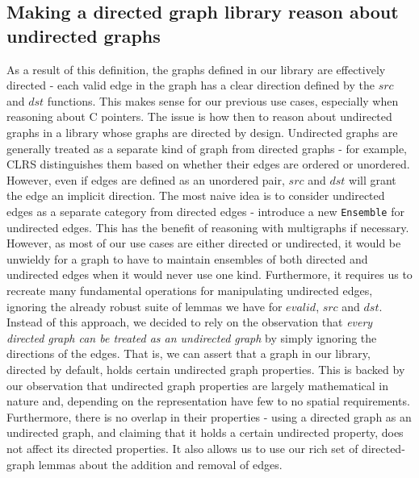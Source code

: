 \subsection{Making a directed graph library reason about undirected graphs}

As a result of this definition, the graphs defined in our library are effectively directed - each valid edge in the graph has a clear direction defined by the $src$ and $dst$ functions. This makes sense for our previous use cases, especially when reasoning about C pointers.
\newline\newline
The issue is how then to reason about undirected graphs in a library whose graphs are directed by design. Undirected graphs are generally treated as a separate kind of graph from directed graphs - for example, CLRS distinguishes them based on whether their edges are ordered or unordered. However, even if edges are defined as an unordered pair, $src$ and $dst$ will grant the edge an implicit direction.
\newline\newline
The most naive idea is to consider undirected edges as a separate category from directed edges - introduce a new \texttt{Ensemble} for undirected edges. This has the benefit of reasoning with multigraphs if necessary. However, as most of our use cases are either directed or undirected, it would be unwieldy for a graph to have to maintain ensembles of both directed and undirected edges when it would never use one kind. Furthermore, it requires us to recreate many fundamental operations for manipulating undirected edges, ignoring the already robust suite of lemmas we have for $evalid$, $src$ and $dst$.
\newline\newline
Instead of this approach, we decided to rely on the observation that \textit{every directed graph can be treated as an undirected graph} by simply ignoring the directions of the edges. That is, we can assert that a graph in our library, directed by default, holds certain undirected graph properties. This is backed by our observation that undirected graph properties are largely mathematical in nature and, depending on the representation have few to no spatial requirements. Furthermore, there is no overlap in their properties - using a directed graph as an undirected graph, and claiming that it holds a certain undirected property, does not affect its directed properties. It also allows us to use our rich set of directed-graph lemmas about the addition and removal of edges.

